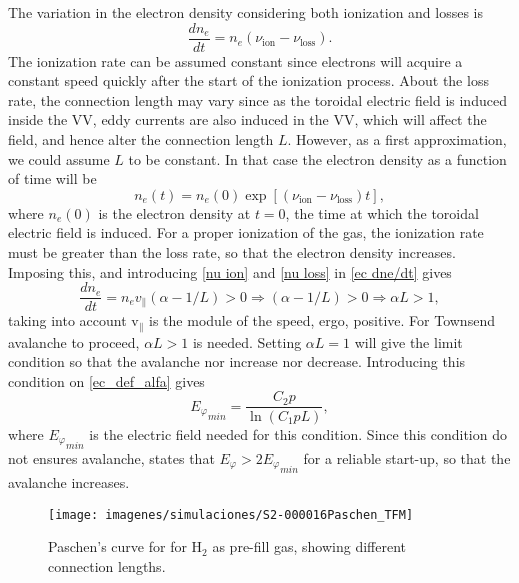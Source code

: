 \documentclass[a4paper,12pt,oneside]{book}
\begin{document}
The variation in the electron density considering both ionization and losses is
%
\begin{equation}\label{ec dne/dt}
\dfrac{d n_e}{dt}=n_e (\nu_\text{ion}-\nu_\text{loss}).
\end{equation}
The ionization rate can be assumed constant since electrons will acquire a constant speed quickly after the start of the ionization process. About the loss rate, the connection length may vary since as the toroidal electric field is induced inside the VV, eddy currents are also induced in the VV, which will affect the field, and hence alter the connection length $L$. However, as a first approximation, we could assume $L$ to be constant. In that case the electron density as a function of time will be
%
\begin{equation}\label{ec ne}
n_e(t)=n_e(0)\exp{ [(\nu_\text{ion}-\nu_\text{loss})t]},
\end{equation}
where $n_e(0)$ is the electron density at $t=0$, the time at which the toroidal electric field is induced. For a proper ionization of the gas, the ionization rate must be greater than the loss rate, so that the electron density increases. Imposing this, and introducing \eqref{nu ion} and \eqref{nu loss} in \eqref{ec dne/dt} gives
%
\begin{equation}
\dfrac{d n_e}{dt}=n_e v_{\parallel}(\alpha-1/L)>0 \Rightarrow (\alpha-1/L)>0 \Rightarrow \alpha L>1,
\end{equation}
taking into account v$_{\parallel}$ is the module of the speed, ergo, positive. For Townsend avalanche to proceed, $\alpha L>1$ is needed. Setting $\alpha L=1$  will give the limit condition so that the avalanche nor increase nor decrease. Introducing this condition on \eqref{ec_def_alfa} gives
%
\begin{equation}\label{ec Paschen}
{E_\varphi}_{min}=\dfrac{C_2 p}{\ln(C_1 p L)},
\end{equation}
where ${E_\varphi}_{min}$ is the electric field needed for this condition. Since this condition do not ensures avalanche, \cite{ITER_2007} states that $E_\varphi>2{E_\varphi}_{min}$ for a reliable start-up, so that the avalanche increases. 

\begin{wrapfigure}{r}{10cm}
\centering
\texttt{[image: imagenes/simulaciones/S2-000016Paschen\_TFM]}
\caption{Paschen's curve for for H$_2$ as pre-fill gas, showing different connection lengths.}
\label{fig_Paschen_ejemplo}
\end{wrapfigure}
\end{document}
